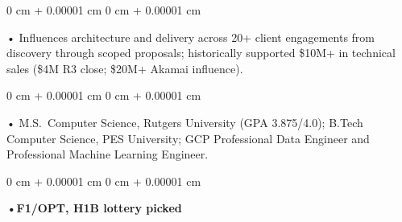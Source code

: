 \documentclass[10pt, letterpaper]{article}
\newenvironment{onecolentry}{
    \begin{adjustwidth}{
        0 cm + 0.00001 cm
    }{
        0 cm + 0.00001 cm
    }
}{
    \end{adjustwidth}
} %
\begin{document}
        \begin{onecolentry}
            • Influences architecture and delivery across 20+ client engagements from discovery through scoped proposals; historically supported \$10M+ in technical sales (\$4M R3 close; \$20M+ Akamai influence).
        \end{onecolentry}
        \begin{onecolentry}
            • M.S.\ Computer Science, Rutgers University (GPA 3.875/4.0); B.Tech Computer Science, PES University; GCP Professional Data Engineer and Professional Machine Learning Engineer.
        \end{onecolentry}
        \begin{onecolentry}
                \textbf{•F1/OPT, H1B lottery picked}
        \end{onecolentry}

    \vspace{2 pt }
\end{document}
